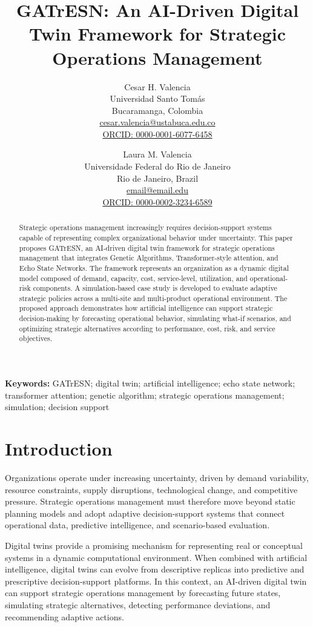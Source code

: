 \documentclass[11pt,a4paper]{article}
\title{GATrESN: An AI-Driven Digital Twin Framework for Strategic Operations Management}
\author{
Cesar H. Valencia\\
Universidad Santo Tom\'as\\
Bucaramanga, Colombia\\
\href{mailto:cesar.valencia@ustabuca.edu.co}{cesar.valencia@ustabuca.edu.co}\\
\href{https://orcid.org/0000-0001-6077-6458}{ORCID: 0000-0001-6077-6458}
\and
Laura M. Valencia\\
Universidade Federal do Rio de Janeiro\\
Rio de Janeiro, Brazil\\
\href{mailto:email@email.edu}{email@email.edu}\\
\href{https://orcid.org/0000-0002-3234-6589}{ORCID: 0000-0002-3234-6589}
}
\date{}
\begin{document}
\maketitle

\begin{abstract}
Strategic operations management increasingly requires decision-support systems capable of representing complex organizational behavior under uncertainty. This paper proposes GATrESN, an AI-driven digital twin framework for strategic operations management that integrates Genetic Algorithms, Transformer-style attention, and Echo State Networks. The framework represents an organization as a dynamic digital model composed of demand, capacity, cost, service-level, utilization, and operational-risk components. A simulation-based case study is developed to evaluate adaptive strategic policies across a multi-site and multi-product operational environment. The proposed approach demonstrates how artificial intelligence can support strategic decision-making by forecasting operational behavior, simulating what-if scenarios, and optimizing strategic alternatives according to performance, cost, risk, and service objectives.
\end{abstract}

\textbf{Keywords:} GATrESN; digital twin; artificial intelligence; echo state network; transformer attention; genetic algorithm; strategic operations management; simulation; decision support

\section{Introduction}
Organizations operate under increasing uncertainty, driven by demand variability, resource constraints, supply disruptions, technological change, and competitive pressure. Strategic operations management must therefore move beyond static planning models and adopt adaptive decision-support systems that connect operational data, predictive intelligence, and scenario-based evaluation.

Digital twins provide a promising mechanism for representing real or conceptual systems in a dynamic computational environment. When combined with artificial intelligence, digital twins can evolve from descriptive replicas into predictive and prescriptive decision-support platforms. In this context, an AI-driven digital twin can support strategic operations management by forecasting future states, simulating strategic alternatives, detecting performance deviations, and recommending adaptive actions.
\end{document}
